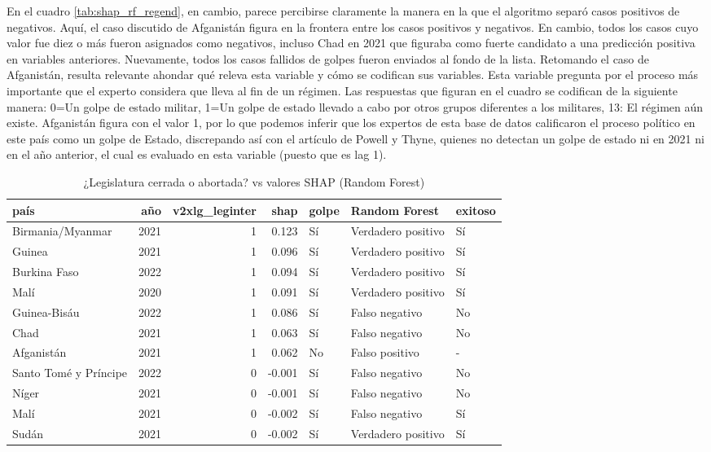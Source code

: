 \documentclass{article}
\begin{document}
En el cuadro \ref{tab:shap_rf_regend}, en cambio, parece percibirse claramente la manera en la que 
el algoritmo separó casos positivos de negativos. Aquí, el caso discutido de Afganistán figura en la
frontera entre los casos positivos y negativos. En cambio, todos los casos cuyo valor fue diez o más
fueron asignados como negativos, incluso Chad en 2021 que figuraba como fuerte candidato a una 
predicción positiva en variables anteriores. Nuevamente, todos los casos fallidos de golpes fueron
enviados al fondo de la lista. Retomando el caso de Afganistán, resulta relevante ahondar qué releva
esta variable y cómo se codifican sus variables. Esta variable pregunta por el proceso más 
importante que el experto considera que lleva al fin de un régimen\cite{CopMet24}. Las respuestas que 
figuran en el cuadro se codifican de la siguiente manera: 0=Un golpe de estado militar, 1=Un golpe de 
estado llevado a cabo por otros grupos diferentes a los militares, 13: El régimen aún existe. Afganistán
figura con el valor 1, por lo que podemos inferir que los expertos de esta base de datos calificaron
el proceso político en este país como un golpe de Estado, discrepando así con el artículo de Powell y 
Thyne, quienes no detectan un golpe de estado ni en 2021 ni en el año anterior, el cual es evaluado
en esta variable (puesto que es lag 1).

\begin{table}[H]
 \centering
 \begin{tabular}{lrrrlll}
  \toprule
  país & año & v2xlg\_leginter & shap & golpe & Random Forest & exitoso \\
  \midrule
  Birmania/Myanmar & 2021 & 1 & 0.123 & Sí & Verdadero positivo & Sí \\
  Guinea & 2021 & 1 & 0.096 & Sí & Verdadero positivo & Sí \\
  Burkina Faso & 2022 & 1 & 0.094 & Sí & Verdadero positivo & Sí \\
  Malí & 2020 & 1 & 0.091 & Sí & Verdadero positivo & Sí \\
  Guinea-Bisáu & 2022 & 1 & 0.086 & Sí & Falso negativo & No \\
  Chad & 2021 & 1 & 0.063 & Sí & Falso negativo & No \\
  Afganistán & 2021 & 1 & 0.062 & No & Falso positivo & - \\
  Santo Tomé y Príncipe & 2022 & 0 & -0.001 & Sí & Falso negativo & No \\
  Níger & 2021 & 0 & -0.001 & Sí & Falso negativo & No \\
  Malí & 2021 & 0 & -0.002 & Sí & Falso negativo & Sí \\
  Sudán & 2021 & 0 & -0.002 & Sí & Verdadero positivo & Sí \\
  \bottomrule
  \end{tabular}
\caption{¿Legislatura cerrada o abortada? vs valores SHAP (Random Forest) \label{tab:shap_rf_leginter}}
\end{table}
\end{document}

